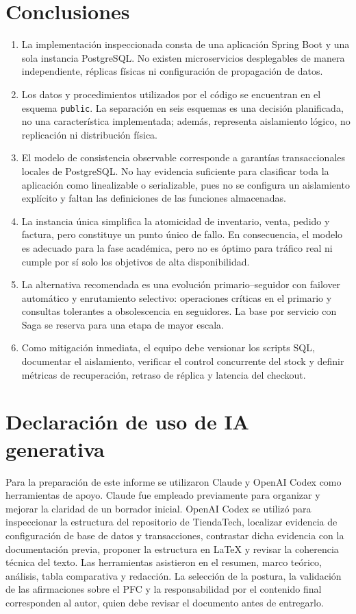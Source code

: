 \documentclass[11pt,a4paper]{article}
\begin{document}
\section{Conclusiones}

\begin{enumerate}[leftmargin=*]
  \item La implementación inspeccionada consta de una aplicación Spring Boot y una sola instancia PostgreSQL. No existen microservicios desplegables de manera independiente, réplicas físicas ni configuración de propagación de datos.
  \item Los datos y procedimientos utilizados por el código se encuentran en el esquema \texttt{public}. La separación en seis esquemas es una decisión planificada, no una característica implementada; además, representa aislamiento lógico, no replicación ni distribución física.
  \item El modelo de consistencia observable corresponde a garantías transaccionales locales de PostgreSQL. No hay evidencia suficiente para clasificar toda la aplicación como linealizable o serializable, pues no se configura un aislamiento explícito y faltan las definiciones de las funciones almacenadas.
  \item La instancia única simplifica la atomicidad de inventario, venta, pedido y factura, pero constituye un punto único de fallo. En consecuencia, el modelo es adecuado para la fase académica, pero no es óptimo para tráfico real ni cumple por sí solo los objetivos de alta disponibilidad.
  \item La alternativa recomendada es una evolución primario--seguidor con failover automático y enrutamiento selectivo: operaciones críticas en el primario y consultas tolerantes a obsolescencia en seguidores. La base por servicio con Saga se reserva para una etapa de mayor escala.
  \item Como mitigación inmediata, el equipo debe versionar los scripts SQL, documentar el aislamiento, verificar el control concurrente del stock y definir métricas de recuperación, retraso de réplica y latencia del checkout.
\end{enumerate}

\section{Declaración de uso de IA generativa}

Para la preparación de este informe se utilizaron Claude y OpenAI Codex como herramientas de apoyo. Claude fue empleado previamente para organizar y mejorar la claridad de un borrador inicial. OpenAI Codex se utilizó para inspeccionar la estructura del repositorio de TiendaTech, localizar evidencia de configuración de base de datos y transacciones, contrastar dicha evidencia con la documentación previa, proponer la estructura en LaTeX y revisar la coherencia técnica del texto. Las herramientas asistieron en el resumen, marco teórico, análisis, tabla comparativa y redacción. La selección de la postura, la validación de las afirmaciones sobre el PFC y la responsabilidad por el contenido final corresponden al autor, quien debe revisar el documento antes de entregarlo.

\printbibliography
\end{document}
